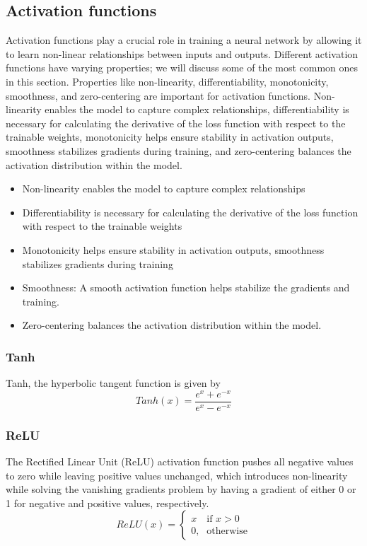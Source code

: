 \subsection{Activation functions}
Activation functions play a crucial role in training a neural network by allowing it to learn non-linear relationships between inputs and outputs.
Different activation functions have varying properties; we will discuss some of the most common ones in this section.
Properties like non-linearity, differentiability, monotonicity, smoothness, and zero-centering are important for activation functions.
Non-linearity enables the model to capture complex relationships, differentiability is necessary for calculating the derivative of the loss function with respect to the trainable weights, monotonicity helps ensure stability in activation outputs, smoothness stabilizes gradients during training, and zero-centering balances the activation distribution within the model.

\begin{itemize}
    \item Non-linearity enables the model to capture complex relationships
    \item Differentiability is necessary for calculating the derivative of the loss function with respect to the trainable weights
    \item Monotonicity helps ensure stability in activation outputs, smoothness stabilizes gradients during training
    \item Smoothness: A smooth activation function helps stabilize the gradients and training.
    \item Zero-centering balances the activation distribution within the model.
\end{itemize}

\subsubsection{Tanh}
Tanh, the hyperbolic tangent function is given by
\begin{equation}\label{eq:tanh}
    Tanh(x) = \frac{e^x+e^{-x}}{e^x-e^{-x}}
\end{equation}

\subsubsection{ReLU}
The Rectified Linear Unit (ReLU) activation function pushes all negative values to zero while leaving positive values unchanged,
which introduces non-linearity while solving the vanishing gradients problem by having a gradient of either 0 or 1 for negative and positive values, respectively.
\begin{equation}\label{eq:relu}
    ReLU(x) = \begin{cases} x & \mbox{if } x > 0 \\ \mbox{0,} & \mbox{otherwise} \end{cases}
\end{equation}

